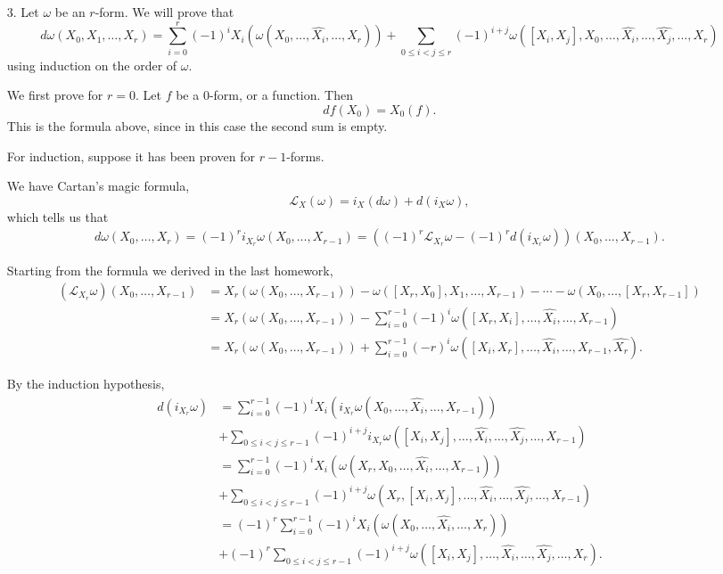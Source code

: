 \documentclass[11pt, reqno]{article}
\theoremstyle{plain}
\theoremstyle{definition}
\theoremstyle{remark}
\begin{document}
\begin{enumerate}
    \item[3.] Let $\omega$ be an $r$-form. We will prove that 
    \[
        d\omega(X_0, X_1, \dots, X_r) = \sum_{i = 0}^r (-1)^i X_i(\omega(X_0, \dots, \hat{X_i}, \dots, X_r))
        + \sum_{0 \leq i < j \leq r} (-1)^{i + j}\omega([X_i, X_j], X_0, \dots, \hat{X_i}, \dots, \hat{X_j}, \dots, X_r)
    \]
    using induction on the order of $\omega$. 

    We first prove for $r = 0$. Let $f$ be a $0$-form, or a function. Then
    \[  
        df(X_0) = X_0(f).
    \]
    This is the formula above, since in this case the second sum is empty.

    For induction, suppose it has been proven for $r-1$-forms. 

    We have Cartan's magic formula,
    \[
        \mathcal{L}_{X}(\omega) = i_{X}(d\omega) + d(i_{X}\omega),
    \]
    which tells us that 
    \begin{gather*}
        d\omega(X_0, \dots, X_r) = (-1)^r i_{X_r}\omega(X_0, \dots, X_{r-1}) = 
        \left((-1)^r \mathcal{L}_{X_r}\omega - (-1)^r d(i_{X_r}\omega)\right)(X_0, \dots, X_{r-1}).
    \end{gather*}

    Starting from the formula we derived in the last homework,
    \begin{align*}
        (\mathcal{L}_{X_r}\omega)(X_0, \dots, X_{r-1}) & = X_r(\omega(X_0, \dots, X_{r-1})) - 
        \omega([X_r, X_0], X_1, \dots, X_{r-1}) - \cdots - \omega(X_0, \dots, [X_r, X_{r-1}])\\
        & = X_r(\omega(X_0, \dots, X_{r-1})) - \sum_{i = 0}^{r-1}(-1)^i\omega([X_r, X_i], \dots, \hat{X_i},\dots, X_{r-1})\\
        & = X_r(\omega(X_0, \dots, X_{r-1})) + \sum_{i = 0}^{r-1}(-r)^i\omega([X_i, X_r], \dots, \hat{X_i}, \dots, X_{r-1}, \hat{X_r}).
    \end{align*}

    By the induction hypothesis, 
    \begin{align*}
        d(i_{X_r}\omega) &= \sum_{i = 0}^{r-1} (-1)^i X_i(i_{X_r}\omega(X_0, \dots, \hat{X_i}, \dots, X_{r-1}))\\
        & + \sum_{0 \leq i < j \leq r-1}(-1)^{i + j}i_{X_r}\omega([X_i, X_j], \dots, \hat{X_i}, \dots, \hat{X_j}, \dots, X_{r-1})\\
        & = \sum_{i = 0}^{r-1} (-1)^i X_i(\omega(X_r, X_0, \dots, \hat{X_i}, \dots, X_{r-1}))\\
        & + \sum_{0 \leq i < j \leq r-1}(-1)^{i + j}\omega(X_r, [X_i, X_j], \dots, \hat{X_i}, \dots, \hat{X_j}, \dots, X_{r-1})\\
        & = (-1)^r \sum_{i = 0}^{r-1} (-1)^i X_i(\omega(X_0, \dots, \hat{X_i}, \dots, X_{r}))\\
        & + (-1)^r\sum_{0 \leq i < j \leq r-1}(-1)^{i + j}\omega([X_i, X_j], \dots, \hat{X_i}, \dots, \hat{X_j}, \dots, X_{r}).
    \end{align*}


\end{enumerate}
\end{document}
